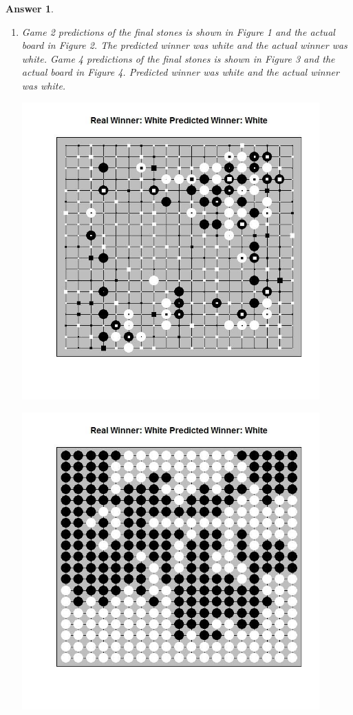 \documentclass[12pt]{article}
\theoremstyle{colon}
\newtheorem*{answer}{Answer}
\begin{document}
\begin{answer}
\begin{enumerate}[label=\arabic*)]
    \item Game 2 predictions of the final stones is shown in Figure 1 and the actual board in Figure 2. The predicted winner was white and the actual winner was white. Game 4 predictions of the final stones is shown in Figure 3 and the actual board in Figure 4. Predicted winner was white and the actual winner was white.
      \begin{center}
        \includegraphics[width=0.9\textwidth]{game_2_prediction.jpg}
      \end{center}

      \begin{center}
        \includegraphics[width=0.9\textwidth]{game_2_final.jpg}
      \end{center}


\end{enumerate}
\end{answer}
\end{document}
